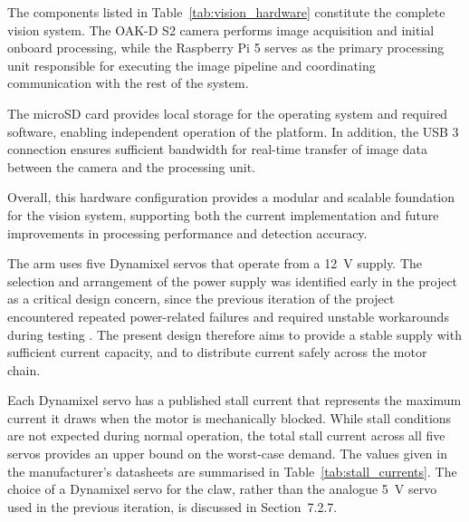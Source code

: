 The components listed in Table~\ref{tab:vision_hardware} constitute the complete vision system. The OAK-D S2 camera performs image acquisition and initial onboard processing, while the Raspberry Pi 5 serves as the primary processing unit responsible for executing the image pipeline and coordinating communication with the rest of the system.

The microSD card provides local storage for the operating system and required software, enabling independent operation of the platform. In addition, the USB 3 connection ensures sufficient bandwidth for real-time transfer of image data between the camera and the processing unit.

Overall, this hardware configuration provides a modular and scalable foundation for the vision system, supporting both the current implementation and future improvements in processing performance and detection accuracy.




The arm uses five Dynamixel servos that operate from a 12~V supply. 
The selection and arrangement of the power supply was identified 
early in the project as a critical design concern, since the previous 
iteration of the project encountered repeated power-related failures 
and required unstable workarounds during testing \cite{hivemind}. The 
present design therefore aims to provide a stable supply with 
sufficient current capacity, and to distribute current safely across 
the motor chain.

Each Dynamixel servo has a published stall current that represents 
the maximum current it draws when the motor is mechanically blocked. 
While stall conditions are not expected during normal operation, the 
total stall current across all five servos provides an upper bound 
on the worst-case demand. The values given in the manufacturer's 
datasheets \cite{robotis_dynamixel} are summarised in 
Table~\ref{tab:stall_currents}. The choice of a Dynamixel servo for 
the claw, rather than the analogue 5~V servo used in the previous 
iteration, is discussed in Section~7.2.7.

